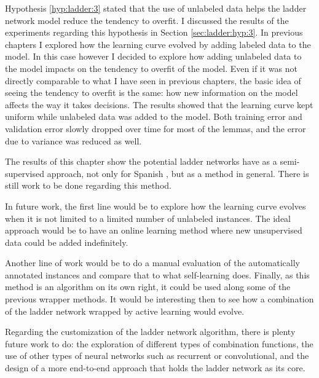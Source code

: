 Hypothesis \ref{hyp:ladder:3} stated that the use of unlabeled data helps the
ladder network model reduce the tendency to overfit. I discussed the results of
the experiments regarding this hypothesis in Section \ref{sec:ladder:hyp:3}.
In previous chapters I explored how the learning curve evolved by adding
labeled data to the model. In this case however I decided to explore how adding
unlabeled data to the model impacts on the tendency to overfit of the model.
Even if it was not directly comparable to what I have seen in previous
chapters, the basic idea of seeing the tendency to overfit is the same: how new
information on the model affects the way it takes decisions. The results showed
that the learning curve kept uniform while unlabeled data was added to the
model. Both training error and validation error slowly dropped over time for
most of the lemmas, and the error due to variance was reduced as well.

The results of this chapter show the potential ladder networks have as a
semi-supervised approach, not only for Spanish \vsd, but as a method in
general. There is still work to be done regarding this method.

In future work, the first line would be to explore how the learning curve
evolves when it is not limited to a limited number of unlabeled instances. The
ideal approach would be to have an online learning \cite{bottou-98x} method
where new unsupervised data could be added indefinitely. 

Another line of work would be to do a manual evaluation of the automatically
annotated instances and compare that to what self-learning does. Finally, as
this method is an algorithm on its own right, it could be used along some of
the previous wrapper methods. It would be interesting then to see how a
combination of the ladder network wrapped by active learning would evolve.

Regarding the customization of the ladder network algorithm, there is plenty
future work to do: the exploration of different types of combination functions,
the use of other types of neural networks such as recurrent or convolutional,
and the design of a more end-to-end approach that holds the ladder network as
its core.
